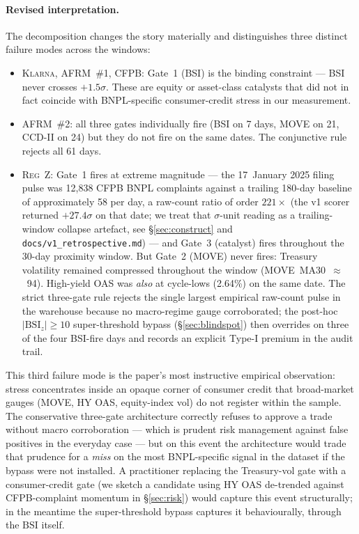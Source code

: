 \documentclass[11pt,letterpaper]{article}
\newcommand{\bsi}{\text{BSI}}
\begin{document}
\paragraph{Revised interpretation.}
The decomposition changes the story materially and distinguishes three
distinct failure modes across the windows:
\begin{itemize}[leftmargin=*,itemsep=2pt]
\item \textsc{Klarna}, \textsc{AFRM~\#1}, \textsc{CFPB}: Gate~1 (BSI)
is the binding constraint --- BSI never crosses $+1.5\sigma$. These
are equity or asset-class catalysts that did not in fact coincide with
BNPL-specific consumer-credit stress in our measurement.
\item \textsc{AFRM~\#2}: all three gates individually fire (BSI on 7
days, MOVE on 21, CCD-II on 24) but they do not fire on the same
dates. The conjunctive rule rejects all 61 days.
\item \textsc{Reg~Z}: Gate~1 fires at extreme magnitude --- the
17~January 2025 filing pulse was 12{,}838 CFPB BNPL complaints against
a trailing 180-day baseline of approximately 58 per day, a raw-count
ratio of order $221\times$ (the v1 scorer returned $+27.4\sigma$ on
that date; we treat that $\sigma$-unit reading as a trailing-window
collapse artefact, see \S\ref{sec:construct} and
\texttt{docs/v1\_retrospective.md}) --- and Gate~3 (catalyst) fires
throughout the 30-day proximity window. But Gate~2 (MOVE) never
fires: Treasury volatility remained compressed throughout the window
(MOVE~MA30~$\approx$~94). High-yield OAS was \emph{also} at
cycle-lows (2.64\%) on the same date. The strict three-gate rule
rejects the single largest empirical raw-count pulse in the warehouse
because no macro-regime gauge corroborated; the post-hoc
$|\bsi_z|\geq10$ super-threshold bypass (\S\ref{sec:blindspot}) then
overrides on three of the four BSI-fire days and records an explicit
Type-I premium in the audit trail.
\end{itemize}

This third failure mode is the paper's most instructive empirical
observation: stress concentrates inside an opaque corner of consumer
credit that broad-market gauges (MOVE, HY OAS, equity-index vol) do
not register within the sample. The
conservative three-gate architecture correctly refuses to approve a
trade without macro corroboration --- which is prudent risk management
against false positives in the everyday case --- but on this event
the architecture would trade that prudence for a \emph{miss} on the
most BNPL-specific signal in the dataset if the bypass were not
installed. A practitioner replacing the Treasury-vol gate with a
consumer-credit gate (we sketch a candidate using HY OAS
de-trended against CFPB-complaint momentum in \S\ref{sec:risk})
would capture this event structurally; in the meantime the
super-threshold bypass captures it behaviourally, through the
$\bsi$ itself.
\end{document}
